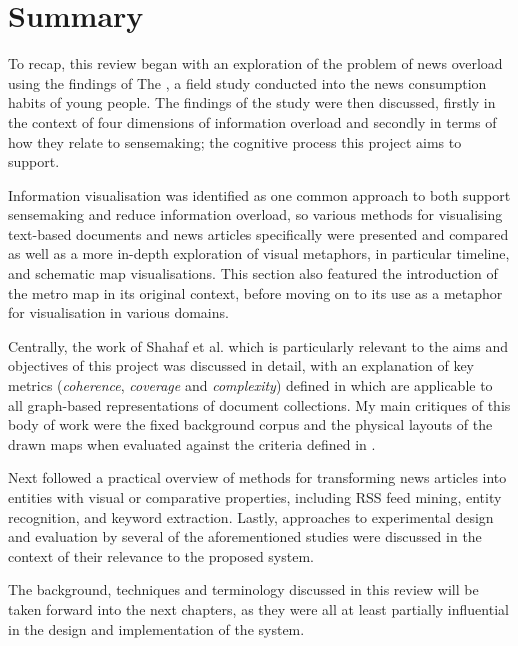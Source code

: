 \section{Summary}

To recap, this review began with an exploration of the problem of news overload using the findings of The \cite{anewmodelfornews}, a field study conducted into the news consumption habits of young people. The findings of the study were then discussed, firstly in the context of four dimensions of information overload \citep{TowardsAnOptimalResolutionToInformationOverload, GuestEditorsIntroductionInformationOverload} and secondly in terms of how they relate to sensemaking; the cognitive process this project aims to support.

Information visualisation was identified as one common approach to both support sensemaking and reduce information overload, so various methods for visualising text-based documents and news articles specifically were presented and compared \citep{ESTHETE, ThemeRiver, InteractiveTopicBasedVisualTextSummarizationAndAnalysis, ExploringLongRunningNewsStoriesUsingWikipedia, Nreader} as well as a more in-depth exploration of visual metaphors, in particular timeline, and schematic map visualisations. This section also featured the introduction of the metro map in its original context, before moving on to its use as a metaphor for visualisation in various domains.

Centrally, the work of Shahaf et al. \citep{ConnectingTheDots, GeneratingInformationMaps, MetroMapsOfScience, InformationCartographyPre} which is particularly relevant to the aims and objectives of this project was discussed in detail, with an explanation of key metrics (\textit{coherence}, \textit{coverage} and \textit{complexity}) defined in \citep{GeneratingInformationMaps} which are applicable to all graph-based representations of document collections. My main critiques of this body of work were the fixed background corpus and the physical layouts of the drawn maps when evaluated against the criteria defined in \citep{TheBasisForGraphDrawingAlgorithms, AutomaticMetroMapLayout}.

Next followed a practical overview of methods for transforming news articles into entities with visual or comparative properties, including RSS feed mining, entity recognition, and keyword extraction. Lastly, approaches to experimental design and evaluation by several of the aforementioned studies were discussed in the context of their relevance to the proposed system. 

The background, techniques and terminology discussed in this review will be taken forward into the next chapters, as they were all at least partially influential in the design and implementation of the system.